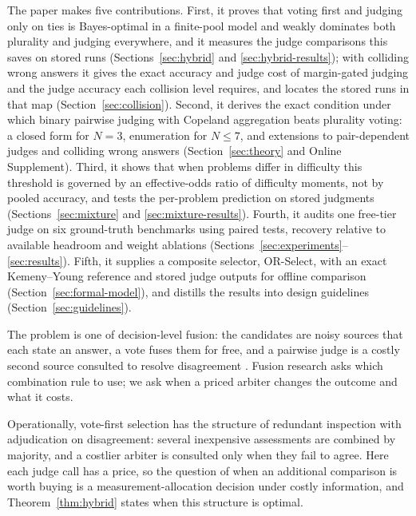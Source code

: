 \documentclass[preprint,11pt,number,sort&compress]{elsarticle}
\begin{document}
The paper makes five contributions. First, it proves that voting first and
judging only on ties is Bayes-optimal in a finite-pool model and weakly
dominates both plurality and judging everywhere, and it measures the judge
comparisons this saves on stored runs (Sections~\ref{sec:hybrid} and
\ref{sec:hybrid-results}); with colliding wrong answers it gives the exact
accuracy and judge cost of margin-gated judging and the judge accuracy each
collision level requires, and locates the stored runs in that map
(Section~\ref{sec:collision}). Second, it derives the exact condition under which
binary pairwise judging with Copeland aggregation beats plurality voting: a
closed form for $N=3$, enumeration for $N\le7$, and extensions to
pair-dependent judges and colliding wrong answers (Section~\ref{sec:theory} and
Online Supplement). Third, it shows that when problems differ in difficulty this
threshold is governed by an effective-odds ratio of difficulty moments, not by
pooled accuracy, and tests the per-problem prediction on stored judgments
(Sections~\ref{sec:mixture} and \ref{sec:mixture-results}). Fourth, it audits
one free-tier judge on six ground-truth benchmarks using paired tests, recovery
relative to available headroom and weight ablations
(Sections~\ref{sec:experiments}--\ref{sec:results}). Fifth, it supplies a composite
selector, OR-Select, with an exact Kemeny--Young reference and stored judge
outputs for offline comparison (Section~\ref{sec:formal-model}), and distills the
results into design guidelines (Section~\ref{sec:guidelines}).

The problem is one of decision-level fusion: the candidates are noisy sources that
each state an answer, a vote fuses them for free, and a pairwise judge is a costly
second source consulted to resolve disagreement \citep{campagner2023aggregation}. Fusion
research asks which combination rule to use; we ask when a priced arbiter changes
the outcome and what it costs.

Operationally, vote-first selection has the structure of redundant inspection
with adjudication on disagreement: several inexpensive assessments are combined
by majority, and a costlier arbiter is consulted only when they fail to agree.
Here each judge call has a price, so the question of when an additional
comparison is worth buying is a measurement-allocation decision under costly
information, and Theorem~\ref{thm:hybrid} states when this structure is optimal.
\end{document}
